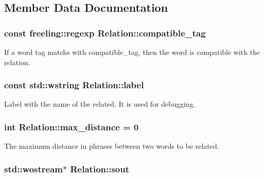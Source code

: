 \subsection{Member Data Documentation}
\hypertarget{classRelation_a3c44dc364bd5530017a4828fee9a14bf}{}
\subsubsection[{compatible\+\_\+tag}]{\setlength{\rightskip}{0pt plus 5cm}const freeling\+::regexp Relation\+::compatible\+\_\+tag\hspace{0.3cm}{\ttfamily [protected]}}\label{classRelation_a3c44dc364bd5530017a4828fee9a14bf}


If a word tag matchs with compatible\+\_\+tag, then the word is compatible with the relation. 

\hypertarget{classRelation_a4885622334809b177f87b9034d9218fe}{}
\subsubsection[{label}]{\setlength{\rightskip}{0pt plus 5cm}const std\+::wstring Relation\+::label}\label{classRelation_a4885622334809b177f87b9034d9218fe}


Label with the name of the related. It is used for debugging. 

\hypertarget{classRelation_a634818cf4618e3862961d457e8ba0448}{}
\subsubsection[{max\+\_\+distance}]{\setlength{\rightskip}{0pt plus 5cm}int Relation\+::max\+\_\+distance = 0\hspace{0.3cm}{\ttfamily [static]}}\label{classRelation_a634818cf4618e3862961d457e8ba0448}


The maximum distance in phrases between two words to be related. 

\hypertarget{classRelation_a44deec0ee05d803ea23e14520fd57a75}{}
\subsubsection[{sout}]{\setlength{\rightskip}{0pt plus 5cm}std\+::wostream$\ast$ Relation\+::sout\hspace{0.3cm}{\ttfamily [protected]}}\label{classRelation_a44deec0ee05d803ea23e14520fd57a75}


